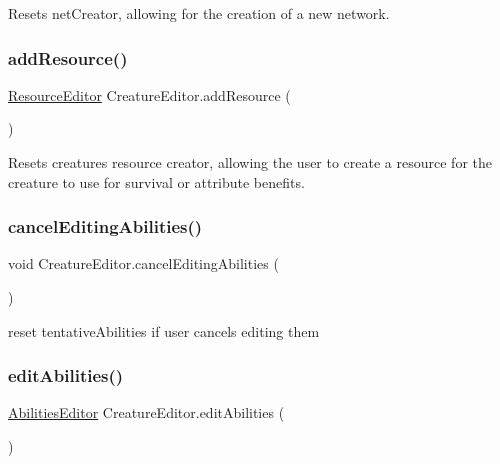 Resets net\+Creator, allowing for the creation of a new network. 

\mbox{\label{class_creature_editor_a6cd78de22a211b236369afe62ea60c99}} 
\subsubsection{\texorpdfstring{add\+Resource()}{addResource()}}
{\footnotesize\ttfamily \mbox{\hyperlink{class_resource_editor}{Resource\+Editor}} Creature\+Editor.\+add\+Resource (\begin{DoxyParamCaption}{ }\end{DoxyParamCaption})}



Resets creatures resource creator, allowing the user to create a resource for the creature to use for survival or attribute benefits. 

\mbox{\label{class_creature_editor_afc80714657aedc32aaaa54760bc6b78f}} 
\subsubsection{\texorpdfstring{cancel\+Editing\+Abilities()}{cancelEditingAbilities()}}
{\footnotesize\ttfamily void Creature\+Editor.\+cancel\+Editing\+Abilities (\begin{DoxyParamCaption}{ }\end{DoxyParamCaption})}



reset tentative\+Abilities if user cancels editing them 

\mbox{\label{class_creature_editor_a60b1083bafbb24636e356f2ca79e91b7}} 
\subsubsection{\texorpdfstring{edit\+Abilities()}{editAbilities()}}
{\footnotesize\ttfamily \mbox{\hyperlink{class_abilities_editor}{Abilities\+Editor}} Creature\+Editor.\+edit\+Abilities (\begin{DoxyParamCaption}{ }\end{DoxyParamCaption})}



